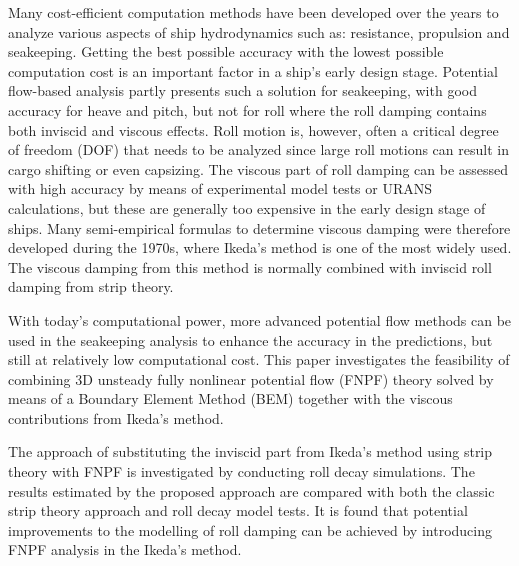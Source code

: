 Many cost-efficient computation methods have been developed over the years to analyze various aspects of ship hydrodynamics such as: resistance, propulsion and seakeeping. Getting the best possible accuracy with the lowest possible computation cost is an important factor in a ship’s early design stage. Potential flow-based analysis partly presents such a solution for seakeeping, with good accuracy for heave and pitch, but not for roll where the roll damping contains both inviscid and viscous effects. Roll motion is, however, often a critical degree of freedom (DOF) that needs to be analyzed since large roll motions can result in cargo shifting or even capsizing. 
The viscous part of roll damping can be assessed with high accuracy by means of experimental model tests or URANS calculations, but these are generally too expensive in the early design stage of ships. Many semi-empirical formulas to determine viscous damping were therefore developed during the 1970s, where Ikeda’s method is one of the most widely used.
The viscous damping from this method is normally combined with inviscid roll damping from strip theory.

With today’s computational power, more advanced potential flow methods can be used in the seakeeping analysis to enhance the accuracy in the predictions, but still at relatively low computational cost. This paper investigates the feasibility of combining 3D unsteady fully nonlinear potential flow (FNPF) theory solved by means of a Boundary Element Method (BEM) together with the viscous contributions from Ikeda’s method.

The approach of substituting the inviscid part from Ikeda’s method using strip theory with FNPF is investigated by conducting roll decay simulations. The results estimated by the proposed approach are compared with both the classic strip theory approach and roll decay model tests. It is found that potential improvements to the modelling of roll damping can be achieved by introducing FNPF analysis in the Ikeda’s method.

 



